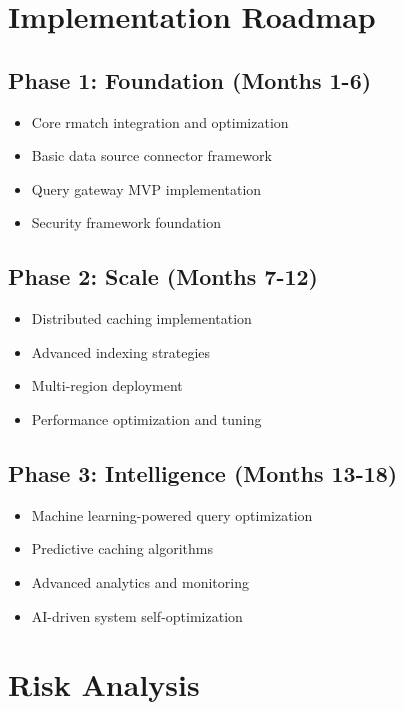 \documentclass[11pt,a4paper]{article}
\begin{document}
\section{Implementation Roadmap}

\subsection{Phase 1: Foundation (Months 1-6)}
\begin{itemize}
\item Core rmatch integration and optimization
\item Basic data source connector framework
\item Query gateway MVP implementation
\item Security framework foundation
\end{itemize}

\subsection{Phase 2: Scale (Months 7-12)}
\begin{itemize}
\item Distributed caching implementation
\item Advanced indexing strategies
\item Multi-region deployment
\item Performance optimization and tuning
\end{itemize}

\subsection{Phase 3: Intelligence (Months 13-18)}
\begin{itemize}
\item Machine learning-powered query optimization
\item Predictive caching algorithms
\item Advanced analytics and monitoring
\item AI-driven system self-optimization
\end{itemize}

\section{Risk Analysis}
\end{document}
